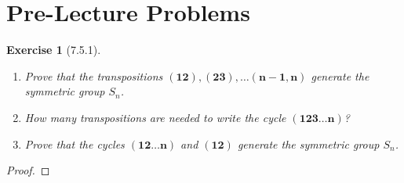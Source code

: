 \documentclass[12pt]{article}
\newtheorem*{exer}{Exercise}
\newcommand{\cycle}[1]{(\mathbf{#1})}
\begin{document}

\section*{Pre-Lecture Problems}

\begin{exer}[7.5.1]

    \begin{enumerate}
        \item Prove that the transpositions $\cycle{12}, \cycle{23},
            \dots \cycle{n - 1, n}$ generate the symmetric group $S_n$. 

        \item How many transpositions are needed to write the cycle
            $\cycle{123 \dots n}$?

        \item Prove that the cycles $\cycle{12 \dots n}$ and
            $\cycle{12}$ generate the symmetric group $S_n$.
    \end{enumerate}

\end{exer}

\begin{proof}

\end{proof}

\end{document}
